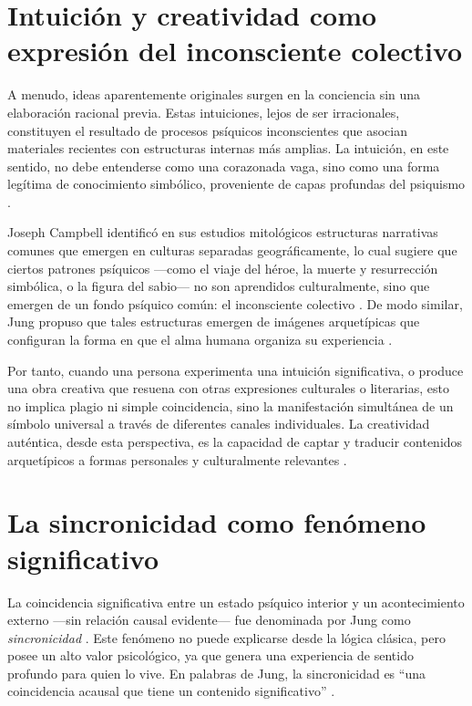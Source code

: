 \section*{Intuición y creatividad como expresión del inconsciente colectivo}

A menudo, ideas aparentemente originales surgen en la conciencia sin una elaboración racional previa. Estas intuiciones, lejos de ser irracionales, constituyen el resultado de procesos psíquicos inconscientes que asocian materiales recientes con estructuras internas más amplias. La intuición, en este sentido, no debe entenderse como una corazonada vaga, sino como una forma legítima de conocimiento simbólico, proveniente de capas profundas del psiquismo \cite{jung1959,jung1971}.

Joseph Campbell identificó en sus estudios mitológicos estructuras narrativas comunes que emergen en culturas separadas geográficamente, lo cual sugiere que ciertos patrones psíquicos —como el viaje del héroe, la muerte y resurrección simbólica, o la figura del sabio— no son aprendidos culturalmente, sino que emergen de un fondo psíquico común: el inconsciente colectivo \cite{campbell1949}. De modo similar, Jung propuso que tales estructuras emergen de imágenes arquetípicas que configuran la forma en que el alma humana organiza su experiencia \cite{jung1964}.

Por tanto, cuando una persona experimenta una intuición significativa, o produce una obra creativa que resuena con otras expresiones culturales o literarias, esto no implica plagio ni simple coincidencia, sino la manifestación simultánea de un símbolo universal a través de diferentes canales individuales. La creatividad auténtica, desde esta perspectiva, es la capacidad de captar y traducir contenidos arquetípicos a formas personales y culturalmente relevantes \cite{jung1959}.

\section*{La sincronicidad como fenómeno significativo}

La coincidencia significativa entre un estado psíquico interior y un acontecimiento externo —sin relación causal evidente— fue denominada por Jung como \textit{sincronicidad} \cite{jung1959,jungpauli1952}. Este fenómeno no puede explicarse desde la lógica clásica, pero posee un alto valor psicológico, ya que genera una experiencia de sentido profundo para quien lo vive. En palabras de Jung, la sincronicidad es ``una coincidencia acausal que tiene un contenido significativo'' \cite{jung1959}.

